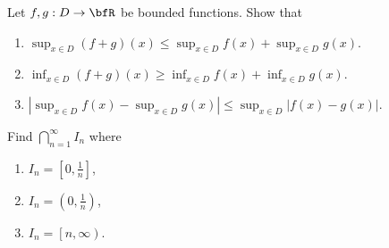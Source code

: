 \documentclass[10pt,twoside,openany]{memoir}
\begin{document}
    \begin{exercise}
        Let $f,g:D \rightarrow \bfR$ be bounded functions. Show that
            \begin{enumerate}[label = (\arabic*)]
                \item $\sup_{x\in D}(f+g)(x) \leq \sup_{x\in D}f(x) + \sup_{x\in D}g(x)$.
                \item $\inf_{x\in D}(f+g)(x) \geq \inf_{x\in D}f(x) + \inf_{x\in D}g(x)$.
                \item $\left|\sup_{x \in D}f(x) - \sup_{x \in D}g(x)\right| \leq \sup_{x\in D}\left|f(x) - g(x)\right|$.
            \end{enumerate}
    \end{exercise}
    \begin{exercise}
        Find $\bigcap_{n = 1}^\infty I_n$ where
            \begin{enumerate}[label = (\arabic*)]
                \item $I_n = \left[0,\frac{1}{n}\right]$,
                \item $I_n = \left(0, \frac{1}{n}\right)$,
                \item $I_n = \left[n , \infty\right)$.
            \end{enumerate}
    \end{exercise}
\end{document}
